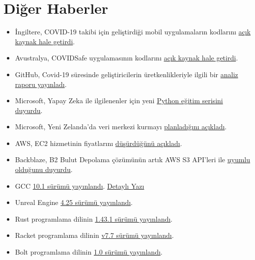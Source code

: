 \documentclass[11pt]{article}
\begin{document}
\section{Diğer Haberler}
\label{sec:orgcdf034e}
\begin{itemize}
\item İngiltere, COVID-19 takibi için geliştirdiği mobil uygulamaların kodlarını
\href{https://github.com/nhsx}{açık kaynak hale getirdi}.
\item Avustralya, COVIDSafe uygulamasının kodlarını \href{https://www.dta.gov.au/news/dta-publicly-releases-covidsafe-application-source-code}{açık kaynak hale getirdi}.
\item GitHub, Covid-19 süresinde geliştiricilerin üretkenlikleriyle ilgili bir
\href{https://github.blog/2020-05-06-octoverse-spotlight-an-analysis-of-developer-productivity-work-cadence-and-collaboration-in-the-early-days-of-covid-19/}{analiz raporu yayınladı}.
\item Microsoft, Yapay Zeka ile ilgilenenler için yeni \href{https://www.zdnet.com/article/microsoft-our-new-free-python-programming-language-courses-are-for-novice-ai-developers/}{Python eğitim serisini
duyurdu}.
\item Microsoft, Yeni Zelanda'da veri merkezi kurmayı \href{https://news.microsoft.com/en-nz/2020/05/06/aotearoa-disclosure/}{planladığını açıkladı}.
\item AWS, EC2 hizmetinin fiyatlarını \href{https://aws.amazon.com/blogs/aws/ec2-price-reduction-for-ec2-instance-saving-plans-and-standard-reserved-instances/}{düşürdüğünü açıkladı}.
\item Backblaze, B2 Bulut Depolama çözümünün artık AWS S3 API'leri ile \href{https://www.backblaze.com/blog/backblaze-b2-s3-compatible-api/}{uyumlu
olduğunu duyurdu}.
\item GCC \href{https://gcc.gnu.org/pipermail/gcc-announce/2020/000163.html}{10.1 sürümü yayınlandı}. \href{https://gcc.gnu.org/gcc-10/changes.html}{Detaylı Yazı}
\item Unreal Engine \href{https://www.unrealengine.com/en-US/blog/unreal-engine-4-25-released}{4.25 sürümü yayınlandı}.
\item Rust programlama dilinin \href{https://blog.rust-lang.org/2020/05/07/Rust.1.43.1.html}{1.43.1 sürümü yayınlandı}.
\item Racket programlama dilinin \href{https://download.racket-lang.org/v7.7.html}{v7.7 sürümü yayınlandı}.
\item Bolt programlama dilinin \href{https://github.com/mukul-rathi/bolt/releases/tag/1.0}{1.0 sürümü yayınlandı}.

\end{itemize}
\end{document}
